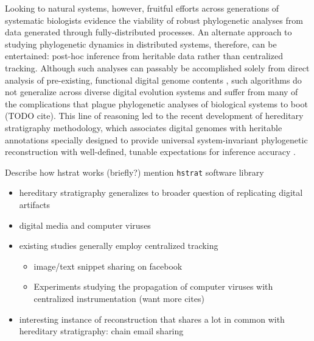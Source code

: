 Looking to  natural systems, however, fruitful efforts across generations of systematic biologists evidence the viability of robust phylogenetic analyses from data generated through fully-distributed processes.
An alternate approach to studying phylogenetic dynamics in distributed systems, therefore, can be entertained: post-hoc inference from heritable data rather than centralized tracking.
Although such analyses can passably be accomplished solely from direct analysis of pre-existing, functional digital genome contents \citep{moreno2021case}, such algorithms do not generalize across diverse digital evolution systems and suffer from many of the complications that plague phylogenetic analyses of biological systems to boot (TODO cite).
This line of reasoning led to the recent development of hereditary stratigraphy methodology, which associates digital genomes with heritable annotations specially designed to provide universal system-invariant phylogenetic reconstruction with well-defined, tunable expectations for inference accuracy
\citep{moreno2022hereditary}.

Describe how hstrat works (briefly?)
mention \texttt{hstrat} software library \citep{moreno2022hstrat}



\begin{itemize}
  \item hereditary stratigraphy generalizes to broader question of replicating digital artifacts
  \item digital media and computer viruses
  \item existing studies generally employ centralized tracking
  \begin{itemize}
    \item image/text snippet sharing on facebook \citep{friggeri2014rumor}
    \item Experiments studying the propagation of computer viruses with centralized instrumentation \citep{cohen1987computer} (want more cites)
  \end{itemize}
  \item interesting instance of reconstruction that shares a lot in common with hereditary stratigraphy: chain email sharing \citep{libennowell2008tracing}
\end{itemize}

